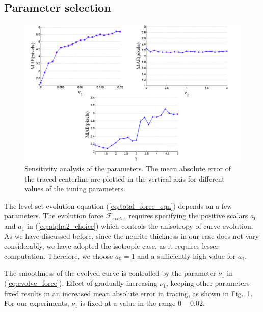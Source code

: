 \subsection{Parameter selection}
\begin{figure}[t]
\centering
\includegraphics[width=0.8\linewidth]{./images/TuFF/parameter}
\caption[Parameter sensitivity analysis]{Sensitivity analysis of the parameters. The mean absolute error of the traced centerline are plotted in the vertical axis for different values of the tuning parameters.}
\label{fig:param}
\end{figure}

The level set evolution equation (\ref{eq:total_force_eqn}) depends on a few parameters. The evolution force $\mathcal{F}_{evolve}$ requires specifying the positive scalars $a_0$ and $a_1$ in (\ref{eq:alpha2_choice}) which controls the anisotropy of curve evolution. As we have discussed before, since the neurite thickness in our case does not vary considerably, we have adopted the isotropic case, as it requires lesser computation. Therefore, we choose $a_0=1$ and a sufficiently high value for $a_1$. 


The smoothness of the evolved curve is controlled by the parameter $\nu_1$ in (\ref{eq:evolve_force}). Effect of gradually increasing $\nu_1$, keeping other parameters fixed results in an increased mean absolute error in tracing, as shown in Fig.~\ref{fig:param}. For our experiments, $\nu_1$ is fixed at a value in the range $0-0.02$.

